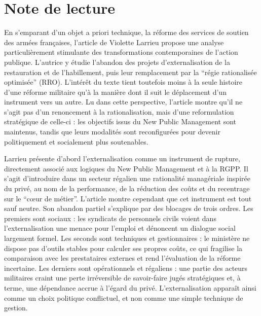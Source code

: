 \documentclass[12pt,a4paper]{article}
\begin{document}
\section*{Note de lecture}
En s'emparant d'un objet a priori technique, la r\'eforme des services de soutien des arm\'ees fran\c caises, l'article de Violette Larrieu propose une analyse particuli\`erement stimulante des transformations contemporaines de l'action publique. L'autrice y \'etudie l'abandon des projets d'externalisation de la restauration et de l'habillement, puis leur remplacement par la ``r\'egie rationalis\'ee optimis\'ee'' (RRO). L'int\'er\^et du texte tient toutefois moins \`a la seule histoire d'une r\'eforme militaire qu'\`a la mani\`ere dont il suit le d\'eplacement d'un instrument vers un autre. Lu dans cette perspective, l'article montre qu'il ne s'agit pas d'un renoncement \`a la rationalisation, mais d'une reformulation strat\'egique de celle-ci : les objectifs issus du New Public Management sont maintenus, tandis que leurs modalit\'es sont reconfigur\'ees pour devenir politiquement et socialement plus soutenables.

Larrieu pr\'esente d'abord l'externalisation comme un instrument de rupture, directement associ\'e aux logiques du New Public Management et \`a la RGPP. Il s'agit d'introduire dans un secteur r\'egalien une rationalit\'e manag\'eriale inspir\'ee du priv\'e, au nom de la performance, de la r\'eduction des co\^uts et du recentrage sur le ``c\oe ur de m\'etier''. L'article montre cependant que cet instrument est tout sauf neutre. Son abandon partiel s'explique par des blocages de trois ordres. Les premiers sont sociaux : les syndicats de personnels civils voient dans l'externalisation une menace pour l'emploi et d\'enoncent un dialogue social largement formel. Les seconds sont techniques et gestionnaires : le minist\`ere ne dispose pas d'outils stables pour calculer ses propres co\^uts, ce qui fragilise la comparaison avec les prestataires externes et rend l'\'evaluation de la r\'eforme incertaine. Les derniers sont op\'erationnels et r\'egaliens : une partie des acteurs militaires craint une perte irr\'eversible de savoir-faire jug\'es strat\'egiques et, \`a terme, une d\'ependance accrue \`a l'\'egard du priv\'e. L'externalisation appara\^it ainsi comme un choix politique conflictuel, et non comme une simple technique de gestion.
\end{document}
